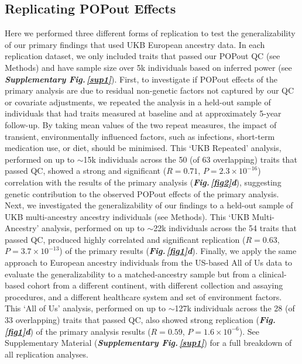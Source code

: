 \documentclass[12pt]{zHenriquesLab-StyleBioRxiv}
\newcommand\dref[2]{\normalsize{\textbf{\textit{Fig.\,\ref{#1}#2}}}\normalsize{}}
\newcommand\sref[1]{\normalsize{\textbf{\textit{Supplementary Fig.\,\ref{#1}}}}\normalsize{}}
\begin{document}
\subsection*{Replicating POPout Effects} \label{sec:res1}
Here we performed three different forms of replication to test the generalizability of our primary 
findings that used UKB European ancestry data. In each replication dataset, 
we only included traits that passed our POPout QC (see Methods) and have sample size 
over 5k individuals based on inferred power (see \sref{sup1}). First, 
to investigate if POPout effects of the primary analysis are due to residual 
non-genetic factors not captured by our QC or covariate adjustments, we repeated 
the analysis in a held-out sample of individuals that had traits measured at 
baseline and at approximately 5-year follow-up. By taking mean values of the 
two repeat measures, the impact of transient, environmentally influenced factors, 
such as infections, short-term medication use, or diet, should be minimised. 
This ‘UKB Repeated’ analysis, performed on up to $\sim$15k individuals across the 
50 (of 63 overlapping) traits that passed QC, showed a strong and 
significant ($R=0.71$, $P=2.3 \times 10^{-16}$) correlation with the results 
of the primary analysis (\dref{fig2}{d}), suggesting genetic contribution to the 
observed POPout effects of the primary analysis. Next, we investigated the generalizability 
of our findings to a held-out sample of UKB multi-ancestry ancestry individuals (see Methods). 
This ‘UKB Multi-Ancestry’ analysis, performed on up to $\sim$22k individuals across the 
54 traits that passed QC, produced highly correlated and significant 
replication ($R=0.63$, $P=3.7 \times 10^{-13}$) of the primary results (\dref{fig1}{d}). 
Finally, we apply the same approach to European ancestry individuals from the 
US-based All of Us data \cite{Bick2024} to evaluate the generalizability to a matched-ancestry 
sample but from a clinical-based cohort from a different continent, with different 
collection and assaying procedures, and a different healthcare system and set of 
environment factors. This ‘All of Us’ analysis, performed on up to $\sim$127k individuals 
across the 28 (of 33 overlapping) traits that passed QC, also showed strong replication (\dref{fig1}{d}) of the primary 
analysis results ($R=0.59$, $P=1.6 \times 10^{-6}$). 
See Supplementary Material (\sref{sup1}) for a full breakdown of all replication analyses. 
%
%
\end{document}
